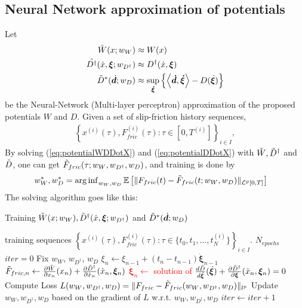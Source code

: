 \subsection{Neural Network approximation of potentials}
\noindent Let 
\begin{align*}
    \Tilde{W}(x; w_W) &\approx W(x) \\
    \Tilde{D^\dagger}(\dot{x}, \bm{\xi}; w_{D^\dagger}) &\approx D^\dagger(\dot{x}, \bm{\xi}) \\
    \Tilde{D}^*(\dot{\bm{d}}; w_D) &\approx \sup_{\bm{\dot{\xi}}} \left\{\left\langle \bm{\dot{d}}, \bm{\dot{\xi}} \right\rangle -D(\dot{\bm{\xi}})\right\}
\end{align*}
be the Neural-Network (Multi-layer perceptron) approximation of the proposed potentials $W$ and $D$. 
Given a set of slip-friction history sequences,
\begin{align*}
    \left\{x^{(i)}(\tau), F^{(i)}_{fric}(\tau) : \tau \in [0, T^{(i)}]\right\}_{i \in I}, 
\end{align*}
By solving (\ref{eq:potentialWDDotX}) and (\ref{eq:potentialDDotX}) with $\Tilde{W}, \Tilde{D}^\dagger$ and $\Tilde{D}$, 
one can get $\Tilde{F}_{fric}(\tau;w_W, w_{D^\dagger}, w_D)$, 
and training is done by 
\begin{align}
    w_W^*, w_D^* &= \operatorname{arg\,inf}_{w_W, w_D} \mathbb{E} \left[\|F_{fric}(t) - \Tilde{F}_{fric}(t; w_W, w_D)\|_{\mathcal{L}^p[0, T]}\right] \label{eq:NNPotentialstraining}
\end{align}
The solving algorithm goes like this:
\begin{algorithm}[H]
\caption{Training $\Tilde{W}(x; w_W), \Tilde{D}^\dagger(\dot{x}, \bm{\xi}; w_{D^\dagger})$ and $\Tilde{D}^*(\dot{\bm{d}}; w_D)$}\label{alg:TrainingOneEpoch}
\begin{algorithmic}
\Require training sequences $\left\{x^{(i)}(\tau), F^{(i)}_{fric}(\tau) : \tau \in \{t_0, t_1, ..., t_N^{(i)}\}\right\}_{i \in I}$.  
\Require $N_{epochs}$
\State $iter = 0$
        \State Fix $w_W$, $w_{D^\dagger}$, $w_D$
            \State $\xi_n \gets \xi_{n-1} + (t_n-t_{n-1}) \dot{\bm{\xi}}_{n-1}$
            \State $\Tilde{F}_{fric, n} \gets \frac{\partial \Tilde{W}}{\partial x_n}(x_n) + \frac{\partial \Tilde{D}^\dagger}{\partial \dot{x}_n}(\dot{x}_n, \bm{\xi}_n)$
            \State \textcolor{red}{$\bm{\dot{\xi}}_n \gets $ solution of $\frac{d \Tilde{D}}{d \dot{\boldsymbol{\xi}}}(\dot{\bm{\xi}}) + \frac{\partial \Tilde{D}^\dagger}{\partial \boldsymbol{\xi}}(\dot{x}_n, \bm{\xi}_n) = 0$}
        \EndFor
        \State Compute Loss $L(w_W, w_{D^\dagger}, w_D) = \|F_{fric} - \Tilde{F}_{fric}(w_W, w_{D^\dagger}, w_D)\|_{{l}^p}$
        \State Update $w_W, w_{D^\dagger}, w_D$ based on the gradient of $L$ w.r.t. $w_W, w_{D^\dagger}, w_D$
    \EndFor
    \State $iter \gets iter+1$
\EndWhile
\end{algorithmic}
\end{algorithm}

